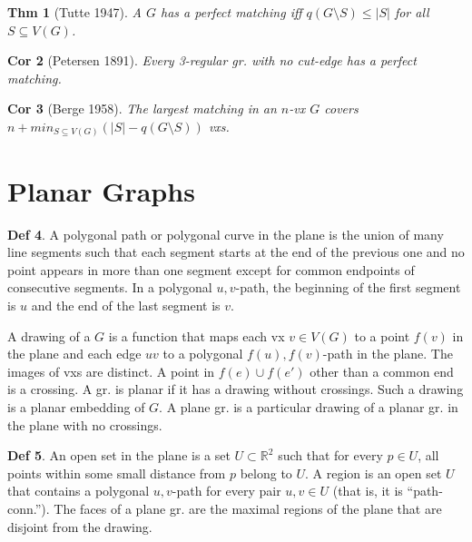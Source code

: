 \documentclass[11pt, fleqn, a4paper, landscape]{article}
\theoremstyle{plain} %
\newtheorem{thm}{Thm}
\newtheorem{cor}[thm]{Cor}
\theoremstyle{remark} %
\newtheorem{rem}[thm]{Rem}
\theoremstyle{definition} %
\newtheorem{defi}[thm]{Def}
\begin{document}
\begin{multicols}{5}
\begin{thm}[Tutte 1947]
A $G$ has a perfect matching iff $q(G\setminus S) \le|S|$ for
all $S \subseteq V (G)$.
\end{thm}

\begin{cor}[Petersen 1891]
Every 3-regular gr. with no cut-edge has a perfect matching.
\end{cor}
\addtocounter{thm}{1}
\begin{cor}[Berge 1958]
The largest matching in an $n$-vx $G$ covers $n+min_{S\subseteq V (G)}(|S|- q(G\setminus S))$ vxs.
\end{cor}

\section{Planar Graphs}
\begin{defi}
A polygonal path or polygonal curve in the plane is the union of many line segments such that each segment starts at the end of the previous one and no point appears in more than one segment except for common endpoints of consecutive segments. In a polygonal $u, v$-path, the beginning of the first segment is $u$ and the end of the last segment is $v$.

A drawing of a $G$ is a function that maps each vx $v\in V (G)$ to a point $f(v)$ in the plane and each edge $uv$ to a polygonal $f(u), f(v)$-path in the plane. The images of vxs are distinct.
A point in $f(e)\cup f(e')$ other than a common end is a crossing. A gr. is planar if it has a drawing without crossings. Such a drawing is a planar embedding of $G$. A plane gr. is a particular drawing of a planar gr. in the plane with no crossings.
\end{defi}
\addtocounter{thm}{1}
\addtocounter{thm}{1}

\begin{defi}
An open set in the plane is a set $U \subset \mathbb{R}^2$ such that for every $p\in U$, all points within some small distance from $p$ belong to $U$. A region is an open set $U$ that contains a polygonal $u, v$-path for every pair $u, v \in U$ (that is, it is “path-conn.”). The faces of a plane gr. are the maximal regions of the plane that are disjoint from the drawing.
\end{defi}


\end{multicols}
\end{document}

